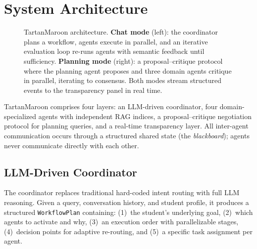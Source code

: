 
\section{System Architecture}

\begin{figure}[t]
\centering
\caption{TartanMaroon architecture. \textbf{Chat mode} (left): the coordinator plans a workflow, agents execute in parallel, and an iterative evaluation loop re-runs agents with semantic feedback until sufficiency. \textbf{Planning mode} (right): a proposal--critique protocol where the planning agent proposes and three domain agents critique in parallel, iterating to consensus. Both modes stream structured events to the transparency panel in real time.}
\label{fig:architecture}
\end{figure}

TartanMaroon comprises four layers: an LLM-driven coordinator, four domain-specialized agents with independent RAG indices, a proposal--critique negotiation protocol for planning queries, and a real-time transparency layer. All inter-agent communication occurs through a structured shared state (the \emph{blackboard}); agents never communicate directly with each other.

\subsection{LLM-Driven Coordinator}

The coordinator replaces traditional hard-coded intent routing with full LLM reasoning. Given a query, conversation history, and student profile, it produces a structured \texttt{WorkflowPlan} containing: (1)~the student's underlying goal, (2)~which agents to activate and why, (3)~an execution order with parallelizable stages, (4)~decision points for adaptive re-routing, and (5)~a specific task assignment per agent.

